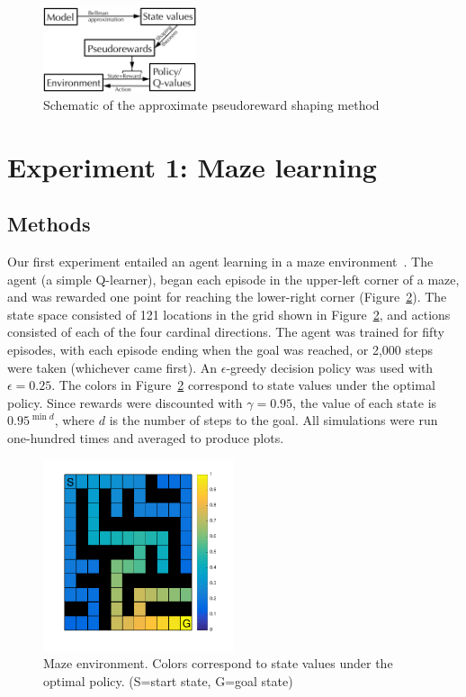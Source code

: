 \documentclass[letterpaper]{article}
\begin{document}
\begin{figure}[ht]
\centering
\includegraphics[width=0.4\textwidth]{approxPR_schematic}
\caption{Schematic of the approximate pseudoreward shaping method}
\label{fig:approxPR_schematic}
\end{figure}

\section{Experiment 1: Maze learning}

\subsection{Methods}

Our first experiment entailed an agent learning in a maze environment~\cite{sutton1991dyna, sutton1991planning, peng1993efficient, sutton1998reinforcement, wiering2012reinforcement}. The agent (a simple Q-learner), began each episode in the upper-left corner of a maze, and was rewarded one point for reaching the lower-right corner (Figure~\ref{fig:maze_values}). The state space consisted of 121 locations in the grid shown in Figure~\ref{fig:maze_values}, and actions consisted of each of the four cardinal directions. The agent was trained for fifty episodes, with each episode ending when the goal was reached, or 2,000 steps were taken (whichever came first). An $\epsilon$-greedy decision policy was used with $\epsilon = 0.25$. The colors in Figure~\ref{fig:maze_values} correspond to state values under the optimal policy. Since rewards were discounted with $\gamma = 0.95$, the value of each state is $0.95^{\min{d}}$, where $d$ is the number of steps to the goal. All simulations were run one-hundred times and averaged to produce plots.

\begin{figure}[ht]
\centering
\includegraphics[width=0.5\textwidth]{maze_values}
\caption{Maze environment. Colors correspond to state values under the optimal policy. (S=start state, G=goal state)}
\label{fig:maze_values}
\end{figure}
\end{document}
